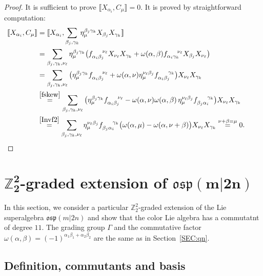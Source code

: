 \documentclass[10pt,a4paper]{amsart}
\numberwithin{equation}{section}
\theoremstyle{definition}
\def\nn{\notag}
\def\Z2{\mathbb{Z}_2^2}
\def\osp{\mathfrak{osp}}
\begin{document}
\begin{proof}
	It is sufficient to prove $ \llbracket X_{\alpha_i}, C_{\mu} \rrbracket = 0. $
	It is proved by straightforward computation:
	\begin{align*}
		\llbracket X_{\alpha_i}, C_{\mu} \rrbracket &= \llbracket X_{\alpha_i}, \sum_{\beta_j,\gamma_k} \eta_{\mu}^{\beta_j \gamma_k} X_{\beta_j} X_{\gamma_k} \rrbracket
		\nn\\
		&= \sum_{\beta_j,\gamma_k,\nu_{\ell}} \eta_{\mu}^{\beta_j \gamma_k}
		\big( f_{\alpha_i \beta_j}^{\quad \ \nu_{\ell}} X_{\nu_{\ell}} X_{\gamma_k} + \omega(\alpha,\beta) f_{\alpha_i \gamma_k}^{\quad\ \nu_{\ell}} X_{\beta_j} X_{\nu_{\ell}} \big)
		\nn\\
		&=
		\sum_{\beta_j,\gamma_k,\nu_{\ell}}
		\big( \eta_{\mu}^{\beta_j \gamma_k} f_{\alpha_i \beta_j}^{\quad \ \nu_{\ell}} + \omega(\alpha,\nu) \eta_{\mu}^{\nu_{\ell} \beta_j} f_{\alpha_i \beta_j}^{\quad \ \gamma_k} \big)
		X_{\nu_{\ell}} X_{\gamma_k}
		\nn \\
		&\stackrel{\eqref{fskew}}{=}
		\sum_{\beta_j,\gamma_k,\nu_{\ell}}
		\big( \eta_{\mu}^{\beta_j \gamma_k} f_{\alpha_i \beta_j}^{\quad \ \nu_{\ell}} - \omega(\alpha,\nu) \omega(\alpha,\beta)\, \eta_{\mu}^{\nu_{\ell} \beta_j} f_{\beta_j \alpha_i}^{\quad \ \gamma_k} \big)
		X_{\nu_{\ell}} X_{\gamma_k}
		\nn\\
		&\stackrel{\eqref{Invf2}}{=}
		\sum_{\beta_j,\gamma_k,\nu_{\ell}} \eta_{\mu}^{\nu_{\ell} \beta_j} f_{\beta_j \alpha_i}^{\quad \ \gamma_k} \big( \omega(\alpha,\mu) - \omega(\alpha,\nu+\beta) \big)
		X_{\nu_{\ell}} X_{\gamma_k}
		 \stackrel{\nu+\beta=\mu}{=} 0.\tag*{\qed}
	\end{align*}\renewcommand{\qed}{}
\end{proof}

\section[Z\_2\^{}2-graded extension of osp(m|2n)]{$\boldsymbol{\Z2}$-graded extension of $\boldsymbol{\osp(m|2n)}$} \label{SEC:osp}

In this section, we consider a particular $\Z2$-graded extension of the Lie superalgebra $\osp(m|2n)$ and show that the color Lie algebra has a commutatnt of degree $11.$
The grading group $\Gamma$ and the commutative factor $\omega(\alpha,\beta) = (-1)^{\alpha_1 \beta_1 + \alpha_2\beta_2}$ are the same as in Section~\ref{SEC:qn}.

\subsection{Definition, commutants and basis}
\end{document}
